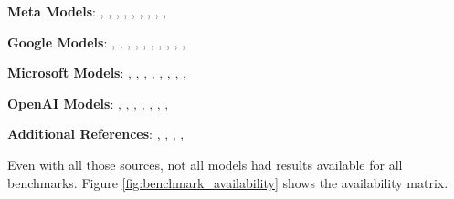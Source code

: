         \begin{tcolorbox}[colback=gray!10, colframe=black, boxrule=1pt, rounded corners]
            \textbf{Meta Models}: 
            \cite{MetaLlama4Scout}, 
            \cite{MetaLlama3.2-3B}, 
            \cite{MetaLlama3.2-1B}, 
            \cite{MetaLlama3.1-70B}, 
            \cite{MetaLlama3.1-8B}, 
            \cite{MetaLlama3-70B}, 
            \cite{MetaLlama3-8B}, 
            \cite{MetaLlama2-70b}, 
            \cite{MetaLlama2-13b}, 
            \cite{MetaLlama2-7b}
            
            \textbf{Google Models}: 
            \cite{GoogleGemma3-27b}, 
            \cite{GoogleGemma3-12b}, 
            \cite{GoogleGemma3-4b}, 
            \cite{GoogleGemma3-1b}, 
            \cite{GoogleGemma2-27b}, 
            \cite{GoogleGemma2-9b}, 
            \cite{GoogleGemma2-2b}, 
            \cite{GoogleGemma-7b}, 
            \cite{GoogleGemma-2b}, 
            \cite{GoogleRecurrentGemma-9b}, 
            \cite{GoogleRecurrentGemma-2b}
            
            \textbf{Microsoft Models}: 
            \cite{MicrosoftPhi4-mini-reasoning}, 
            \cite{MicrosoftPhi4-reasoning}, 
            \cite{MicrosoftPhi4-reasoning-plus}, 
            \cite{MicrosoftPhi4}, 
            \cite{MicrosoftPhi2}, 
            \cite{MicrosoftPhi1-5}, 
            \cite{MicrosoftPhi1}, 
            \cite{Phi1.5}, 
            \cite{Phi2Blog}
            
            \textbf{OpenAI Models}: 
            \cite{OpenAIGPT-oss-120b}, 
            \cite{OpenAIGPT-oss-20b}, 
            \cite{OpenAIGPT2-xl}, 
            \cite{OpenAIGPT2-large}, 
            \cite{OpenAIGPT2-medium}, 
            \cite{OpenAIGPT2}, 
            \cite{OpenAIOpenModels},
            
            \textbf{Additional References}: 
            \cite{HuggingFaceMain}, 
            \cite{Ollama},
            \cite{LLMExplorer}, 
            \cite{RankedAGI},
        \end{tcolorbox} 

        Even with all those sources, not all models had results available for all benchmarks. Figure \ref{fig:benchmark_availability} shows the availability matrix.

